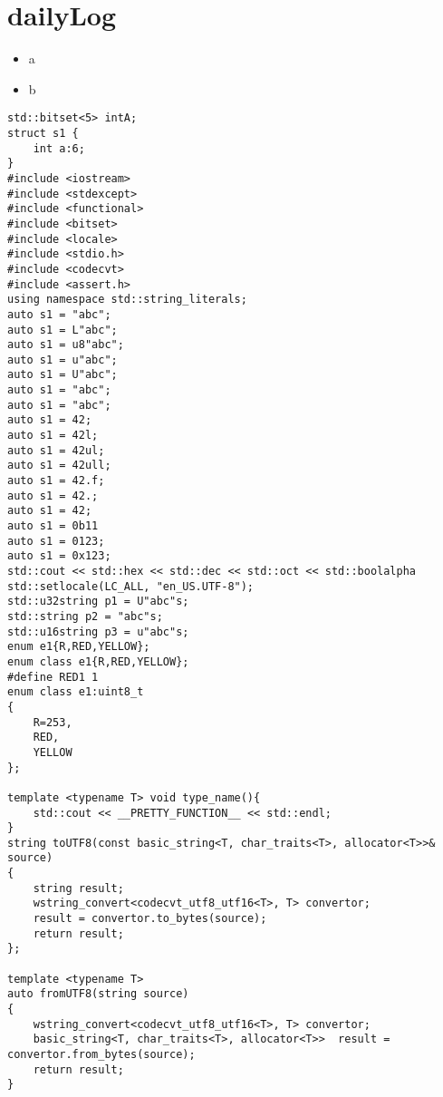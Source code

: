 \section{dailyLog} 
\begin{itemize}
    \item a
    \item b
\end{itemize}

\begin{lstlisting}
std::bitset<5> intA;
struct s1 {
    int a:6;
}
#include <iostream>
#include <stdexcept> 
#include <functional>
#include <bitset>
#include <locale>
#include <stdio.h>
#include <codecvt>
#include <assert.h>
using namespace std::string_literals;  
auto s1 = "abc";
auto s1 = L"abc";
auto s1 = u8"abc";
auto s1 = u"abc";
auto s1 = U"abc";
auto s1 = "abc";
auto s1 = "abc";
auto s1 = 42;
auto s1 = 42l;
auto s1 = 42ul;
auto s1 = 42ull;
auto s1 = 42.f;
auto s1 = 42.;
auto s1 = 42;
auto s1 = 0b11
auto s1 = 0123;
auto s1 = 0x123;
std::cout << std::hex << std::dec << std::oct << std::boolalpha
std::setlocale(LC_ALL, "en_US.UTF-8");
std::u32string p1 = U"abc"s;
std::string p2 = "abc"s;
std::u16string p3 = u"abc"s;
enum e1{R,RED,YELLOW};
enum class e1{R,RED,YELLOW};
#define RED1 1
enum class e1:uint8_t
{
    R=253,
    RED,
    YELLOW
};

template <typename T> void type_name(){
    std::cout << __PRETTY_FUNCTION__ << std::endl;
}
string toUTF8(const basic_string<T, char_traits<T>, allocator<T>>& source)
{
    string result;
    wstring_convert<codecvt_utf8_utf16<T>, T> convertor;
    result = convertor.to_bytes(source);
    return result;
};

template <typename T>
auto fromUTF8(string source)
{
    wstring_convert<codecvt_utf8_utf16<T>, T> convertor;
    basic_string<T, char_traits<T>, allocator<T>>  result = convertor.from_bytes(source);
    return result;
}





\end{lstlisting}
